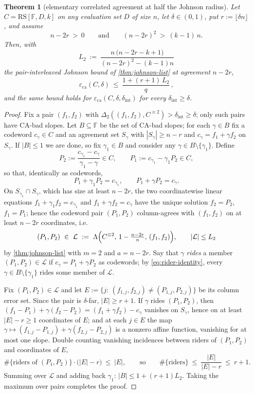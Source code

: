 \documentclass[11pt]{article}
\newtheorem{theorem}{Theorem}[section]
\theoremstyle{definition}
\theoremstyle{remark}
\newcommand{\F}{\mathbb{F}}
\newcommand{\RS}{\mathrm{RS}}
\newcommand{\eca}{\varepsilon_{\mathrm{ca}}}
\newcommand{\dist}{\Delta}
\newcommand{\Lst}{\Lambda}
\begin{document}
\begin{theorem}[elementary correlated agreement at half the Johnson radius]\label{thm:elementary-ca}
Let $C=\RS[\F,D,k]$ on any evaluation set $D$ of size $n$, let $\delta\in(0,1)$, put $r:=\lfloor\delta n\rfloor$, and assume
\[
n-2r\ >\ 0
\qquad\text{and}\qquad
(n-2r)^2\ >\ (k-1)\,n .
\]
Then, with
\[
L_2\ :=\ \frac{n\,\bigl(n-2r-k+1\bigr)}{(n-2r)^2-(k-1)n}
\]
the pair-interleaved Johnson bound of \cref{thm:johnson-list} at agreement $n-2r$,
\[
\eca(C,\delta)\ \le\ \frac{1+(r+1)\,L_2}{q}\,,
\]
and the same bound holds for $\eca(C,\delta,\delta_{\mathrm{int}})$ for every $\delta_{\mathrm{int}}\ge\delta$.
\end{theorem}

\begin{proof}
Fix a pair $(f_1,f_2)$ with $\dist_2((f_1,f_2),C^{\equiv2})>\delta_{\mathrm{int}}\ge\delta$; only such pairs have CA-bad slopes. Let $B\subseteq\F$ be the set of CA-bad slopes; for each $\gamma\in B$ fix a codeword $c_\gamma\in C$ and an agreement set $S_\gamma$ with $|S_\gamma|\ge n-r$ and $c_\gamma=f_1+\gamma f_2$ on $S_\gamma$. If $|B|\le1$ we are done, so fix $\gamma_1\in B$ and consider any $\gamma\in B\setminus\{\gamma_1\}$. Define
\[
P_2:=\frac{c_{\gamma_1}-c_{\gamma}}{\gamma_1-\gamma}\in C,
\qquad
P_1:=c_{\gamma_1}-\gamma_1P_2\in C,
\]
so that, identically as codewords,
\begin{equation}\label{eq:rider-identity}
P_1+\gamma_1P_2=c_{\gamma_1},
\qquad
P_1+\gamma P_2=c_{\gamma}.
\end{equation}
On $S_{\gamma_1}\cap S_{\gamma}$, which has size at least $n-2r$, the two coordinatewise linear equations $f_1+\gamma_1f_2=c_{\gamma_1}$ and $f_1+\gamma f_2=c_{\gamma}$ have the unique solution $f_2=P_2$, $f_1=P_1$; hence the codeword pair $(P_1,P_2)$ column-agrees with $(f_1,f_2)$ on at least $n-2r$ coordinates, i.e.
\[
(P_1,P_2)\ \in\ \mathcal L\ :=\ \Lst\Bigl(C^{\equiv2},\,1-\tfrac{n-2r}{n},\,(f_1,f_2)\Bigr),
\qquad
|\mathcal L|\le L_2
\]
by \cref{thm:johnson-list} with $m=2$ and $a=n-2r$. Say that $\gamma$ \emph{rides} a member $(P_1,P_2)\in\mathcal L$ if $c_\gamma=P_1+\gamma P_2$ as codewords; by \eqref{eq:rider-identity}, every $\gamma\in B\setminus\{\gamma_1\}$ rides some member of $\mathcal L$.

Fix $(P_1,P_2)\in\mathcal L$ and let $E:=\{j:\ (f_{1,j},f_{2,j})\ne(P_{1,j},P_{2,j})\}$ be its column error set. Since the pair is $\delta$-far, $|E|\ge r+1$. If $\gamma$ rides $(P_1,P_2)$, then $(f_1-P_1)+\gamma(f_2-P_2)=(f_1+\gamma f_2)-c_\gamma$ vanishes on $S_\gamma$, hence on at least $|E|-r\ge1$ coordinates of $E$; and at each $j\in E$ the map $\gamma\mapsto(f_{1,j}-P_{1,j})+\gamma(f_{2,j}-P_{2,j})$ is a nonzero affine function, vanishing for at most one slope. Double counting vanishing incidences between riders of $(P_1,P_2)$ and coordinates of $E$,
\[
\#\{\text{riders of }(P_1,P_2)\}\cdot\bigl(|E|-r\bigr)\ \le\ |E|,
\qquad\text{so}\qquad
\#\{\text{riders}\}\ \le\ \frac{|E|}{|E|-r}\ \le\ r+1 .
\]
Summing over $\mathcal L$ and adding back $\gamma_1$: $|B|\le1+(r+1)L_2$. Taking the maximum over pairs completes the proof.
\end{proof}
\end{document}
